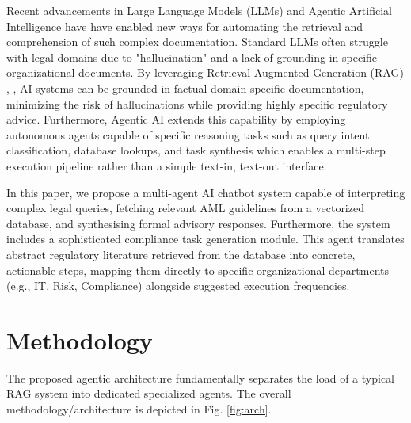 ﻿\documentclass[conference]{IEEEtran}
\begin{document}
Recent advancements in Large Language Models (LLMs) \cite{b1} and Agentic Artificial Intelligence have have enabled new ways for automating the retrieval and comprehension of such complex documentation. Standard LLMs often struggle with legal domains \cite{b2} due to "hallucination" and a lack of grounding in specific organizational documents. By leveraging Retrieval-Augmented Generation (RAG) \cite{b3}, \cite{b4}, AI systems can be grounded in factual domain-specific documentation, minimizing the risk of hallucinations while providing highly specific regulatory advice. Furthermore, Agentic AI extends this capability by employing autonomous agents capable of specific reasoning tasks \cite{b5} such as query intent classification, database lookups, and task synthesis which enables a multi-step execution pipeline rather than a simple text-in, text-out interface.

In this paper, we propose a multi-agent AI chatbot system capable of interpreting complex legal queries, fetching relevant AML guidelines from a vectorized database, and synthesising formal advisory responses. Furthermore, the system includes a sophisticated compliance task generation module. This agent translates abstract regulatory literature retrieved from the database into concrete, actionable steps, mapping them directly to specific organizational departments (e.g., IT, Risk, Compliance) alongside suggested execution frequencies.

\section{Methodology}
The proposed agentic architecture fundamentally separates the load of a typical RAG system into dedicated specialized agents. The overall methodology/architecture is depicted in Fig. \ref{fig:arch}.
\end{document}
